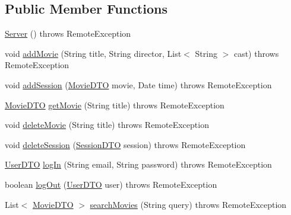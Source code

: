 \subsection*{Public Member Functions}
\begin{DoxyCompactItemize}
\item 
\mbox{\hyperlink{classes_1_1deusto_1_1server_1_1_server_a84f78162a65dd737f224eb2f94c43023}{Server}} ()  throws Remote\+Exception 
\item 
void \mbox{\hyperlink{classes_1_1deusto_1_1server_1_1_server_a150317903dc393d29f39db81e79131e0}{add\+Movie}} (String title, String director, List$<$ String $>$ cast)  throws Remote\+Exception 
\item 
void \mbox{\hyperlink{classes_1_1deusto_1_1server_1_1_server_a465a6299e03ec7d69ed238cb96292e9c}{add\+Session}} (\mbox{\hyperlink{classes_1_1deusto_1_1server_1_1data_1_1_movie_d_t_o}{Movie\+D\+TO}} movie, Date time)  throws Remote\+Exception 
\item 
\mbox{\hyperlink{classes_1_1deusto_1_1server_1_1data_1_1_movie_d_t_o}{Movie\+D\+TO}} \mbox{\hyperlink{classes_1_1deusto_1_1server_1_1_server_a7e4544c63bcf2b2d3abce0d2ff1567ac}{get\+Movie}} (String title)  throws Remote\+Exception 
\item 
void \mbox{\hyperlink{classes_1_1deusto_1_1server_1_1_server_a6501e4103fcc2ef691c15e4e02f7136c}{delete\+Movie}} (String title)  throws Remote\+Exception 
\item 
void \mbox{\hyperlink{classes_1_1deusto_1_1server_1_1_server_aad2637c9cecc8a8b6f89e630b3711bff}{delete\+Session}} (\mbox{\hyperlink{classes_1_1deusto_1_1server_1_1data_1_1_session_d_t_o}{Session\+D\+TO}} session)  throws Remote\+Exception 
\item 
\mbox{\hyperlink{classes_1_1deusto_1_1server_1_1data_1_1_user_d_t_o}{User\+D\+TO}} \mbox{\hyperlink{classes_1_1deusto_1_1server_1_1_server_ab93f5cc9b5825192c31cd2088014378d}{log\+In}} (String email, String password)  throws Remote\+Exception 
\item 
boolean \mbox{\hyperlink{classes_1_1deusto_1_1server_1_1_server_a92cf8a599adfa6a34f7cfe788119cf0a}{log\+Out}} (\mbox{\hyperlink{classes_1_1deusto_1_1server_1_1data_1_1_user_d_t_o}{User\+D\+TO}} user)  throws Remote\+Exception 
\item 
List$<$ \mbox{\hyperlink{classes_1_1deusto_1_1server_1_1data_1_1_movie_d_t_o}{Movie\+D\+TO}} $>$ \mbox{\hyperlink{classes_1_1deusto_1_1server_1_1_server_a16789cc76edd46978ffbb58581caf5db}{search\+Movies}} (String query)  throws Remote\+Exception 
\item 

\end{DoxyCompactItemize}
